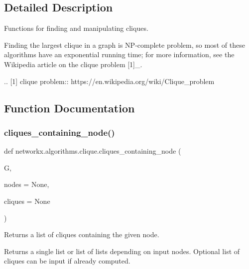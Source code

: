 \subsection{Detailed Description}
\begin{DoxyVerb}Functions for finding and manipulating cliques.

Finding the largest clique in a graph is NP-complete problem, so most of
these algorithms have an exponential running time; for more information,
see the Wikipedia article on the clique problem [1]_.

.. [1] clique problem:: https://en.wikipedia.org/wiki/Clique_problem\end{DoxyVerb}
 

\subsection{Function Documentation}
\mbox{\label{namespacenetworkx_1_1algorithms_1_1clique_a2b1d135f2e0c7acc72c11fef57055a28}} 
\subsubsection{\texorpdfstring{cliques\+\_\+containing\+\_\+node()}{cliques\_containing\_node()}}
{\footnotesize\ttfamily def networkx.\+algorithms.\+clique.\+cliques\+\_\+containing\+\_\+node (\begin{DoxyParamCaption}\item[{}]{G,  }\item[{}]{nodes = {\ttfamily None},  }\item[{}]{cliques = {\ttfamily None} }\end{DoxyParamCaption})}

\begin{DoxyVerb}Returns a list of cliques containing the given node.

Returns a single list or list of lists depending on input nodes.
Optional list of cliques can be input if already computed.
\end{DoxyVerb}
 \mbox{\label{namespacenetworkx_1_1algorithms_1_1clique_a5afae1d234e0fde85e9fbe4722f4b786}} 
